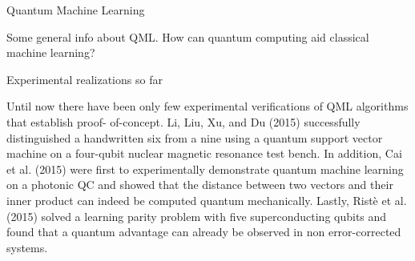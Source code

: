 \documentclass[10pt]{beamer}
\begin{document}
{
\begin{frame}[fragile]{Quantum Machine Learning}

Some general info about QML. How can quantum computing aid classical machine learning?

\end{frame}
}

{
\begin{frame}[fragile]{Experimental realizations so far}


Until now there have been only few experimental verifications of QML algorithms that establish proof-
of-concept. Li, Liu, Xu, and Du (2015) successfully distinguished a handwritten six from a nine using a
quantum support vector machine on a four-qubit nuclear magnetic resonance test bench. In addition, Cai
et al. (2015) were first to experimentally demonstrate quantum machine learning on a photonic QC and
showed that the distance between two vectors and their inner product can indeed be computed quantum
mechanically. Lastly, Ristè et al. (2015) solved a learning parity problem with five superconducting qubits
and found that a quantum advantage can already be observed in non error-corrected systems.




\end{frame}
}
\end{document}
